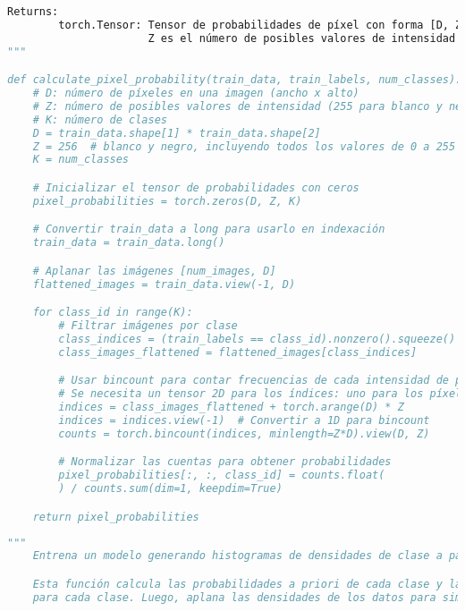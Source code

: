 \documentclass[spanish]{article}
\begin{document}
\begin{enumerate}
\begin{enumerate}
\begin{enumerate}
\begin{enumerate}
\begin{lstlisting}[language=Python, caption=Calculo de probabilidad por intensidad de pixel]
    Returns:
        torch.Tensor: Tensor de probabilidades de píxel con forma [D, Z, K], donde D es el número de píxeles por imagen,
                      Z es el número de posibles valores de intensidad (256 para imágenes en escala de grises), y K es el número de clases.
"""

def calculate_pixel_probability(train_data, train_labels, num_classes):
    # D: número de píxeles en una imagen (ancho x alto)
    # Z: número de posibles valores de intensidad (255 para blanco y negro)
    # K: número de clases
    D = train_data.shape[1] * train_data.shape[2]
    Z = 256  # blanco y negro, incluyendo todos los valores de 0 a 255
    K = num_classes

    # Inicializar el tensor de probabilidades con ceros
    pixel_probabilities = torch.zeros(D, Z, K)

    # Convertir train_data a long para usarlo en indexación
    train_data = train_data.long()

    # Aplanar las imágenes [num_images, D]
    flattened_images = train_data.view(-1, D)

    for class_id in range(K):
        # Filtrar imágenes por clase
        class_indices = (train_labels == class_id).nonzero().squeeze()
        class_images_flattened = flattened_images[class_indices]

        # Usar bincount para contar frecuencias de cada intensidad de píxel en todas las imágenes de la clase
        # Se necesita un tensor 2D para los índices: uno para los píxeles y otro para las imágenes
        indices = class_images_flattened + torch.arange(D) * Z
        indices = indices.view(-1)  # Convertir a 1D para bincount
        counts = torch.bincount(indices, minlength=Z*D).view(D, Z)

        # Normalizar las cuentas para obtener probabilidades
        pixel_probabilities[:, :, class_id] = counts.float(
        ) / counts.sum(dim=1, keepdim=True)

    return pixel_probabilities
\end{lstlisting}


\begin{lstlisting}[language=Python, caption=Calculo de dataset densities]
"""
    Entrena un modelo generando histogramas de densidades de clase a partir de los datos de entrenamiento.

    Esta función calcula las probabilidades a priori de cada clase y las densidades de los datos de entrenamiento
    para cada clase. Luego, aplana las densidades de los datos para simplificar su estructura.


\end{lstlisting}
\end{enumerate}
\end{enumerate}
\end{enumerate}
\end{enumerate}
\end{document}
